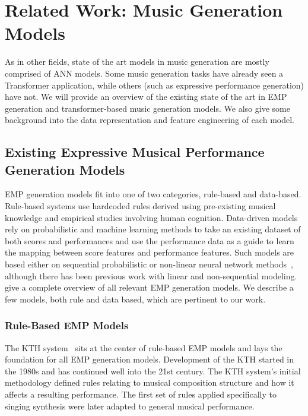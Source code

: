 \chapter{Related Work: Music Generation Models}\label{ch:ch4}
As in other fields, state of the art models in music generation are mostly comprised of ANN models. Some music generation tasks have already seen a Transformer application, while others (such as expressive performance generation) have not. We will provide an overview of the existing state of the art in EMP generation and transformer-based music generation models. We also give some background into the data representation and feature engineering of each model. 

\section{Existing Expressive Musical Performance Generation Models}\label{sec:emp_generation_models}
EMP generation models fit into one of two categories, rule-based and data-based. Rule-based systems use hardcoded rules derived using pre-existing musical knowledge and empirical studies involving human cognition. Data-driven models rely on probabilistic and machine learning methods to take an existing dataset of both scores and performances and use the performance data as a guide to learn the mapping between score features and performance features. Such models are based either on sequential probabilistic or non-linear neural network methods~\cite{cancino2018computational}, although there has been previous work with linear and non-sequential modeling.~\citet{cancino2018computational} give a complete overview of all relevant EMP generation models. We describe a few models, both rule and data based, which are pertinent to our work. 

\subsection{Rule-Based EMP Models}
The KTH system~\cite{friberg2006overview} sits at the center of rule-based EMP models and lays the foundation for all EMP generation models. Development of the KTH started in the 1980s and has continued well into the 21st century. The KTH system's initial methodology defined rules relating to musical composition structure and how it affects a resulting performance. The first set of rules applied specifically to singing synthesis were later adapted to general musical performance. 

